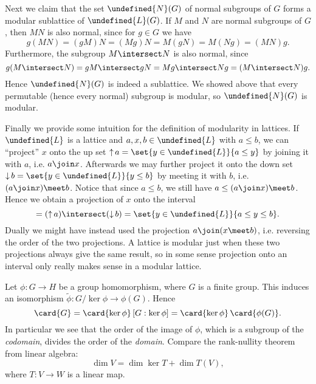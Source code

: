\documentclass[article, a4paper, 11pt, oneside]{memoir}
\let\mathfrak\undefined
\numberwithin{equation}{chapter}
\newcommand{\frakL}{\mathfrak{L}}
\newcommand{\frakN}{\mathfrak{N}}
\theoremstyle{nonumberplain}
\newcommand{\upset}{\operatorname{\uparrow}}
\newcommand{\downset}{\operatorname{\downarrow}}
\begin{document}
\begin{remarkbreak}
    Next we claim that the set $\frakN(G)$ of normal subgroups of $G$ forms a modular sublattice of $\frakL(G)$. If $M$ and $N$ are normal subgroups of $G$, then $MN$ is also normal, since for $g \in G$ we have
    \begin{equation*}
        g(MN)
            = (gM)N
            = (Mg)N
            = M(gN)
            = M(Ng)
            = (MN)g.
    \end{equation*}
    Furthermore, the subgroup $M \intersect N$ is also normal, since
    \begin{equation*}
        g (M \intersect N)
            = gM \intersect gN
            = Mg \intersect Ng
            = (M \intersect N) g.
    \end{equation*}
    Hence $\frakN(G)$ is indeed a sublattice. We showed above that every permutable (hence every normal) subgroup is modular, so $\frakN(G)$ is modular.

    Finally we provide some intuition for the definition of modularity in lattices. If $\frakL$ is a lattice and $a,x,b \in \frakL$ with $a \leq b$, we can \enquote{project} $x$ onto the up set $\upset a = \set{y \in \frakL}{a \leq y}$ by joining it with $a$, i.e. $a \join x$. Afterwards we may further project it onto the down set $\downset b = \set{y \in \frakL}{y \leq b}$ by meeting it with $b$, i.e. $(a \join x) \meet b$. Notice that since $a \leq b$, we still have $a \leq (a \join x) \meet b$. Hence we obtain a projection of $x$ onto the interval
    \begin{equation*}
        [a,b]
            = (\upset a) \intersect (\downset b)
            = \set{y \in \frakL}{a \leq y \leq b}.
    \end{equation*}
    Dually we might have instead used the projection $a \join (x \meet b)$, i.e. reversing the order of the two projections. A lattice is modular just when these two projections always give the same result, so in some sense projection onto an interval only really makes sense in a modular lattice.
\end{remarkbreak}


\begin{remarkbreak}
    Let $\phi \colon G \to H$ be a group homomorphism, where $G$ is a finite group. This induces an isomorphism $\tilde\phi \colon G/\ker\phi \to \phi(G)$. Hence
    \begin{equation*}
        \card{G}
            = \card{\ker\phi} \, [G : \ker\phi]
            = \card{\ker\phi} \, \card{\phi(G)}.
    \end{equation*}
    In particular we see that the order of the image of $\phi$, which is a subgroup of the \emph{codomain}, divides the order of the \emph{domain}. Compare the rank-nullity theorem from linear algebra:
    \begin{equation*}
        \dim V
            = \dim \ker T + \dim T(V),
    \end{equation*}
    where $T \colon V \to W$ is a linear map.
\end{remarkbreak}
\end{document}
